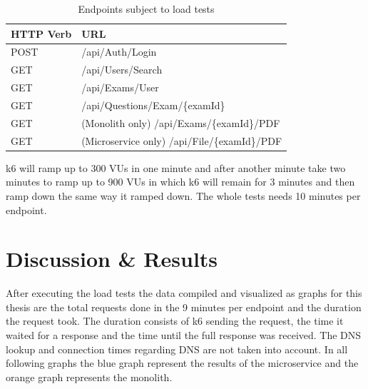 \documentclass[BIF,Bachelor,nenglish]{twbook}%
\begin{document}
\begin{table}[!ht]
    \centering
    \begin{tabular}{|l|l|}
    \hline
        \ac{HTTP} Verb & URL \\ \hline
        POST & /api/Auth/Login \\ \hline
        GET & /api/Users/Search \\ \hline
        GET & /api/Exams/User \\ \hline
        GET & /api/Questions/Exam/\{examId\} \\ \hline
        GET & (Monolith only) /api/Exams/\{examId\}/PDF \\ \hline
        GET & (Microservice only) /api/File/\{examId\}/PDF \\ \hline
    \end{tabular}
 \caption{Endpoints subject to load tests}
 \label{loadTestEndpoints}
\end{table}

\noindent
k6 will ramp up to 300 \ac{VU}s in one minute and after another minute take two minutes to ramp up to 900 \ac{VU}s in which k6 will remain for 3 minutes and then ramp down the same way it ramped down. The whole tests needs 10 minutes per endpoint.

\chapter{Discussion \& Results}
After executing the load tests the data compiled and visualized as graphs for this thesis are the total requests done in the 9 minutes per endpoint and the duration the request took. The duration consists of k6 sending the request, the time it waited for a response and the time until the full response was received. The DNS lookup and connection times regarding DNS are not taken into account.
In all following graphs the blue graph represent the results of the microservice and the orange graph represents the monolith.


\end{document}
